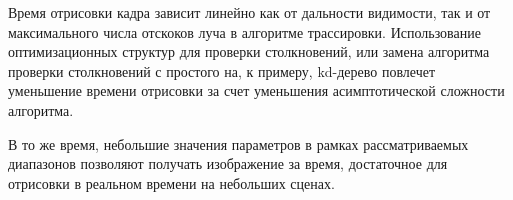 Время отрисовки кадра зависит линейно как от дальности видимости, так и от
максимального числа отскоков луча в алгоритме трассировки. Использование 
оптимизационных структур для проверки столкновений, или замена алгоритма 
проверки столкновений с простого на, к примеру, kd-дерево повлечет 
уменьшение времени отрисовки за счет уменьшения асимптотической сложности 
алгоритма.

В то же время, небольшие значения параметров в рамках рассматриваемых диапазонов
позволяют получать изображение за время, достаточное для отрисовки в реальном времени на 
небольших сценах.



